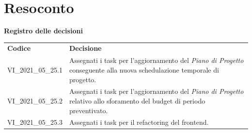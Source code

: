 \documentclass[a4paper]{article}
\begin{document}
\section{Resoconto}
\begin{center}
    \textbf{\Large Registro delle decisioni}\\
    \vspace{10px}
    \begin{table}[h!]
        \centering
        \renewcommand{\arraystretch}{1.8}
        \begin{tabular}{p{200px} p{200px}}
            \rowcolor{logo!70} \textbf{Codice} & \textbf{Decisione}                                                                                                               \\
            VI\_2021\_05\_25.1                 & Assegnati i task per l'aggiornamento del \textit{Piano di Progetto} conseguente alla nuova schedulazione temporale di progetto.  \\
            VI\_2021\_05\_25.2                 & Assegnati i task per l'aggiornamento del \textit{Piano di Progetto} relativo allo sforamento del budget di periodo preventivato. \\
            VI\_2021\_05\_25.3                 & Assegnati i task per il refactoring del frontend.                                                                                \\
        \end{tabular}
    \end{table}
\end{center}
\end{document}
